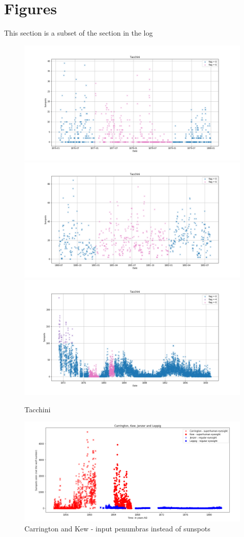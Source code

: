 \documentclass[12pt]{article}
\begin{document}
\newpage

\section{Figures}
This section is a subset of the section in the log

\begin{figure}[H]
    \includegraphics[width=0.5\linewidth]{tacchini1877_patch.png}
    \includegraphics[width=0.5\linewidth]{tacchini1881_patch.png}
    \includegraphics[width=\linewidth]{tacchini_pached.png}
    \caption{Tacchini}
    \label{fig:tacchini}
\end{figure}

\begin{figure}[H]
  \includegraphics[width=\linewidth]{CarringtonHasGoodEyesight.png}
  \caption{Carrington and Kew - input penumbras instead of sunspots}
  \label{fig:carrington-kew-penumbras}
\end{figure}
\end{document}

